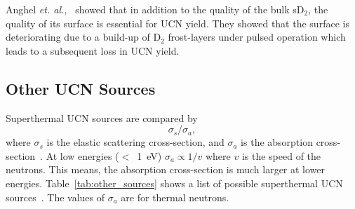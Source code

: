 Anghel {\it{et. al.,}}~\cite{anghel2018solid} showed that in addition
to the quality of the bulk sD$_2$, the quality of its surface is
essential for UCN yield. They showed that the surface is deteriorating
due to a build-up of D$_2$ frost-layers under pulsed operation which
leads to %
a subsequent loss in UCN yield.







\subsection{Other UCN Sources}
Superthermal UCN sources are compared by
\begin{equation}
\sigma_s / \sigma_a,
\end{equation}
where $\sigma_s$ is the elastic scattering cross-section, and
$\sigma_a$ is the absorption
cross-section~\cite{Salvat2013,Atchison2009,Liu_thesis}. At low
energies ($<$~1~eV) $\sigma_a \propto 1/v$ where $v$ is the speed of
the neutrons. This means, the absorption cross-section is much larger
at lower energies.  Table~\ref{tab:other_sources} shows a list of
possible superthermal UCN sources~\cite{Liu_thesis}. The values of
$\sigma_a$ are for thermal neutrons.


